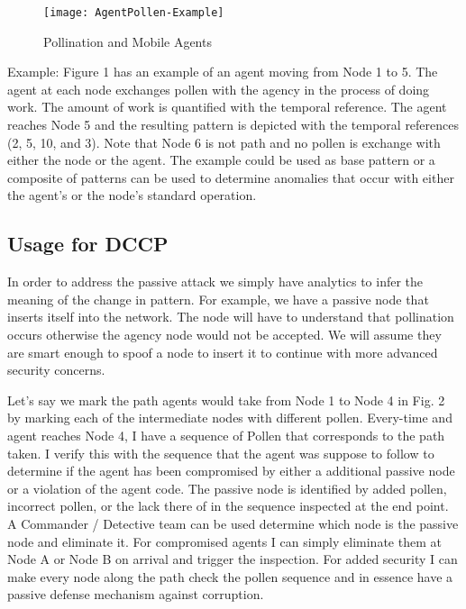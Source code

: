 \documentclass{acm_proc_article-sp}
\begin{document}
\begin{figure}
\centering
\texttt{[image: AgentPollen-Example]}
\caption{Pollination and Mobile Agents}
\end{figure}

Example: Figure 1 has an example of an agent moving from Node 1 to 5. The agent at each node exchanges pollen with the agency in the process of doing work. The amount of work is quantified with the temporal reference. The agent reaches Node 5 and the resulting pattern is depicted with the temporal references (2, 5, 10, and 3). Note that Node 6 is not path and no pollen is exchange with either the node or the agent. The example could be used as base pattern or a composite of patterns can be used to determine anomalies that occur with either the agent’s or the node’s standard operation.  

\subsection{Usage for DCCP}
In order to address the passive attack we simply have analytics to infer the meaning of the change in pattern. For example, we have a passive node that inserts itself into the network. The node will have to understand that pollination occurs otherwise the agency node would not be accepted. We will assume they are smart enough to spoof a node to insert it to continue with more advanced security concerns.  

Let’s say we mark the path agents would take from Node 1 to Node 4 in Fig. 2 by marking each of the intermediate nodes with different pollen.  Every-time and agent reaches Node 4, I have a sequence of Pollen that corresponds to the path taken. I verify this with the sequence that the agent was suppose to follow to determine if the agent has been compromised by either a additional passive node or a violation of the agent code. The passive node is identified by added pollen, incorrect pollen, or the lack there of in the sequence inspected at the end point. A Commander / Detective team can be used determine which node is the passive node and eliminate it. For compromised agents I can simply eliminate them at Node A or Node B on arrival and trigger the inspection. For added security I can make every node along the path check the pollen sequence and in essence have a passive defense mechanism against corruption.
\end{document}
